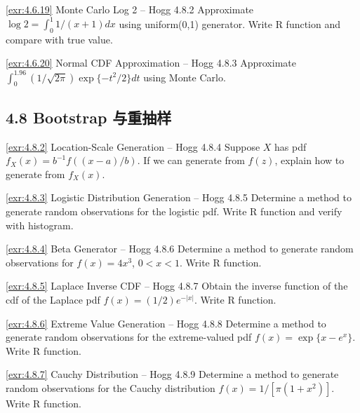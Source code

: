 \begin{exercise}{\ref{exr:4.6.19} Monte Carlo Log 2 – Hogg 4.8.2}\label{exr:4.6.19}
Approximate $\log 2 = \int_0^1 1/(x+1) dx$ using uniform(0,1) generator. Write R function and compare with true value.
\end{exercise}

\begin{exercise}{\ref{exr:4.6.20} Normal CDF Approximation – Hogg 4.8.3}\label{exr:4.6.20}
Approximate $\int_0^{1.96} (1/\sqrt{2\pi}) \exp\{-t^2/2\} dt$ using Monte Carlo.
\end{exercise}

\subsection{4.8 Bootstrap 与重抽样}\label{sec:exercises-4.8}

\begin{exercise}{\ref{exr:4.8.2} Location-Scale Generation – Hogg 4.8.4}\label{exr:4.8.2}
Suppose $X$ has pdf $f_X(x) = b^{-1} f((x-a)/b)$. If we can generate from $f(z)$, explain how to generate from $f_X(x)$.
\end{exercise}

\begin{exercise}{\ref{exr:4.8.3} Logistic Distribution Generation – Hogg 4.8.5}\label{exr:4.8.3}
Determine a method to generate random observations for the logistic pdf. Write R function and verify with histogram.
\end{exercise}

\begin{exercise}{\ref{exr:4.8.4} Beta Generator – Hogg 4.8.6}\label{exr:4.8.4}
Determine a method to generate random observations for $f(x)=4x^3$, $0<x<1$. Write R function.
\end{exercise}

\begin{exercise}{\ref{exr:4.8.5} Laplace Inverse CDF – Hogg 4.8.7}\label{exr:4.8.5}
Obtain the inverse function of the cdf of the Laplace pdf $f(x)=(1/2)e^{-|x|}$. Write R function.
\end{exercise}

\begin{exercise}{\ref{exr:4.8.6} Extreme Value Generation – Hogg 4.8.8}\label{exr:4.8.6}
Determine a method to generate random observations for the extreme-valued pdf $f(x)=\exp\{x-e^x\}$. Write R function.
\end{exercise}

\begin{exercise}{\ref{exr:4.8.7} Cauchy Distribution – Hogg 4.8.9}\label{exr:4.8.7}
Determine a method to generate random observations for the Cauchy distribution $f(x)=1/[\pi(1+x^2)]$. Write R function.
\end{exercise}

